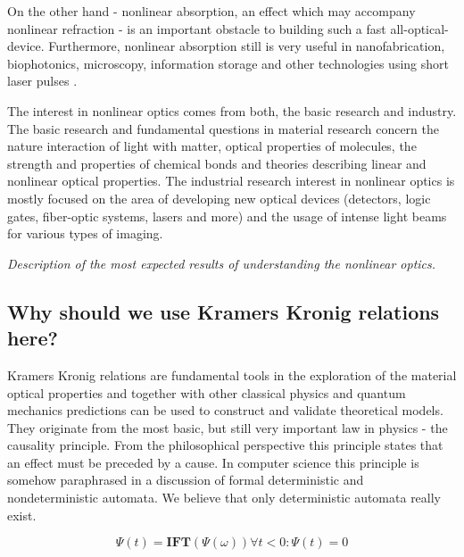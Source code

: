 \documentclass[12pt,twoside,a4paper]{article}
\numberwithin{equation}{subsection}
\numberwithin{figure}{subsection}
\begin{document}
On the other hand - nonlinear absorption, an effect which may accompany nonlinear refraction - is an important obstacle
to building such a fast all-optical-device. Furthermore, nonlinear absorption still is very useful in nanofabrication,
biophotonics, microscopy, information storage and other technologies using short laser pulses \cite{samoc_nlo_absorption}. 

The interest in nonlinear optics comes from both, the basic research and industry. The basic research and fundamental questions in
material research concern the nature interaction of light with matter, optical properties of molecules, the strength and properties of
chemical bonds and theories describing linear and nonlinear optical properties. The industrial research interest in nonlinear
optics is mostly focused on the area of developing new optical devices (detectors, logic gates, fiber-optic systems, lasers and
more) and the usage of intense light beams for various types of imaging.

\textit{Description of the most expected results of understanding the nonlinear optics.}

\subsection{Why should we use Kramers Kronig relations here?} \label{chap:introducion_kk}

Kramers Kronig relations are fundamental tools in the exploration of the material optical properties and together with other classical
physics and quantum mechanics predictions can be used to construct and validate theoretical models. They originate from the most
basic, but still very important law in physics - the causality principle. From the philosophical perspective this principle states
that an effect must be preceded by a cause. In computer science this principle is somehow paraphrased in a discussion of formal
deterministic and nondeterministic automata. We believe that only deterministic automata really exist. 


\begin{subequations}  \label{eq:kk_basis}
 \begin{equation}  \label{eq:kk_basis_ift}
   \Psi (t) = \mathbf{IFT}(\Psi (\omega ))
  \end{equation}
  \begin{equation} \label{eq:kk_basis_casuality}
    \forall t < 0 : \Psi (t) = 0
  \end{equation}
\end{subequations}
\end{document}
